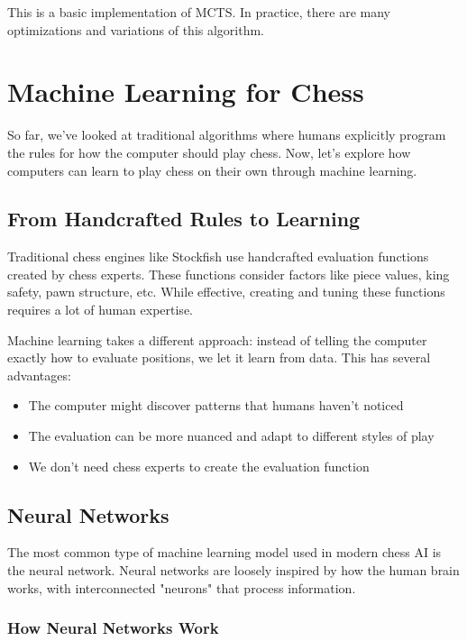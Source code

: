 \documentclass[11pt]{article}
\begin{document}
This is a basic implementation of MCTS. In practice, there are many optimizations and variations of this algorithm.

\section{Machine Learning for Chess}

So far, we've looked at traditional algorithms where humans explicitly program the rules for how the computer should play chess. Now, let's explore how computers can learn to play chess on their own through machine learning.

\subsection{From Handcrafted Rules to Learning}

Traditional chess engines like Stockfish use handcrafted evaluation functions created by chess experts. These functions consider factors like piece values, king safety, pawn structure, etc. While effective, creating and tuning these functions requires a lot of human expertise.

Machine learning takes a different approach: instead of telling the computer exactly how to evaluate positions, we let it learn from data. This has several advantages:
\begin{itemize}
    \item The computer might discover patterns that humans haven't noticed
    \item The evaluation can be more nuanced and adapt to different styles of play
    \item We don't need chess experts to create the evaluation function
\end{itemize}

\subsection{Neural Networks}

The most common type of machine learning model used in modern chess AI is the neural network. Neural networks are loosely inspired by how the human brain works, with interconnected "neurons" that process information.

\subsubsection{How Neural Networks Work}
\end{document}
